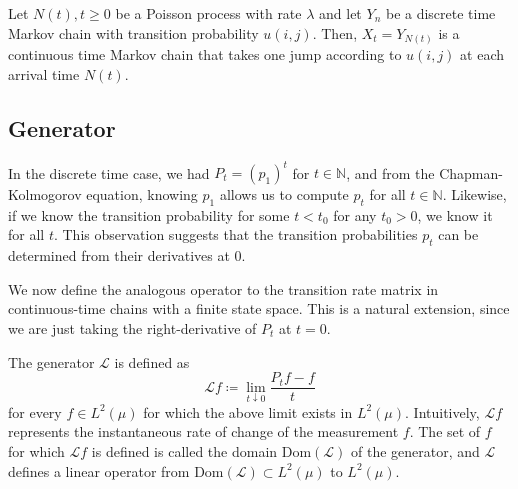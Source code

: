 \documentclass{article}
\begin{document}
  \begin{example}
  Let $N(t), t \geq 0$ be a Poisson process with rate $\lambda$ and let $Y_n$ be a discrete time Markov chain with transition probability $u(i, j)$. Then, $X_t = Y_{N(t)}$ is a continuous time Markov chain that takes one jump according to $u(i, j)$ at each arrival time $N(t)$. 
  \end{example}


  \subsection{Generator}

    In the discrete time case, we had $P_t = (p_1)^t$ for $t \in \mathbb{N}$, and from the Chapman-Kolmogorov equation, knowing $p_1$ allows us to compute $p_t$ for all $t \in \mathbb{N}$. Likewise, if we know the transition probability for some $t < t_0$ for any $t_0 > 0$, we know it for all $t$. This observation suggests that the transition probabilities $p_t$ can be determined from their derivatives at $0$. 

    We now define the analogous operator to the transition rate matrix in continuous-time chains with a finite state space. This is a natural extension, since we are just taking the right-derivative of $P_t$ at $t = 0$. 

    \begin{definition}[Generator]
    The generator $\mathscr{L}$ is defined as 
    \[\mathscr{L} f \coloneqq \lim_{t \downarrow 0} \frac{P_t f - f}{t}\]
    for every $f \in L^2 (\mu)$ for which the above limit exists in $L^2 (\mu)$. Intuitively, $\mathscr{L} f$ represents the instantaneous rate of change of the measurement $f$. The set of $f$ for which $\mathscr{L}f$ is defined is called the domain $\mathrm{Dom}(\mathscr{L})$ of the generator, and $\mathscr{L}$ defines a linear operator from $\mathrm{Dom}(\mathscr{L}) \subset L^2 (\mu)$ to $L^2 (\mu)$. 
    \end{definition}
\end{document}
